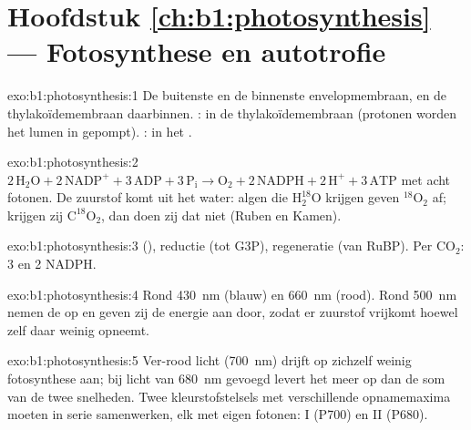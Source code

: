 \section*{Hoofdstuk \ref{ch:b1:photosynthesis} --- Fotosynthese en autotrofie}

\begin{solution}{exo:b1:photosynthesis:1}
De buitenste en de binnenste envelopmembraan, en de thylakoïdemembraan daarbinnen.
: in de thylakoïdemembraan (protonen worden het lumen in gepompt).
: in het .
\end{solution}

\begin{solution}{exo:b1:photosynthesis:2}
$2\,\mathrm{H_2O} + 2\,\mathrm{NADP^+} + 3\,\mathrm{ADP} + 3\,\mathrm{P_i}
\to \mathrm{O_2} + 2\,\mathrm{NADPH} + 2\,\mathrm{H^+} + 3\,\mathrm{ATP}$
met acht fotonen. De zuurstof komt uit het water: algen die
$\mathrm{H_2^{18}O}$ krijgen geven $\mathrm{^{18}O_2}$ af; krijgen zij
$\mathrm{C^{18}O_2}$, dan doen zij dat niet (Ruben en Kamen).
\end{solution}

\begin{solution}{exo:b1:photosynthesis:3}
 (), reductie (tot G3P), regeneratie (van RuBP). Per
$\mathrm{CO_2}$: 3  en 2 NADPH.
\end{solution}

\begin{solution}{exo:b1:photosynthesis:4}
Rond \qty{430}{nm} (blauw) en \qty{660}{nm} (rood). Rond \qty{500}{nm} nemen de
 op en geven zij de energie aan  door, zodat er zuurstof
vrijkomt hoewel  zelf daar weinig opneemt.
\end{solution}

\begin{solution}{exo:b1:photosynthesis:5}
Ver-rood licht (\qty{700}{nm}) drijft op zichzelf weinig fotosynthese aan; bij
licht van \qty{680}{nm} gevoegd levert het meer op dan de som van de twee
snelheden. Twee kleurstofstelsels met verschillende opnamemaxima moeten in serie
samenwerken, elk met eigen fotonen:  I (P700) en  II (P680).
\end{solution}

